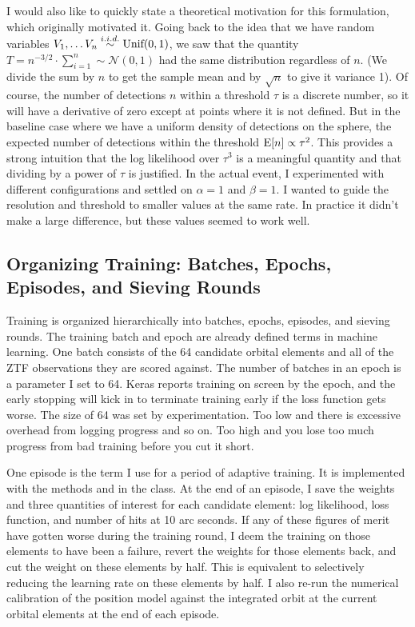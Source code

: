 I would also like to quickly state a theoretical motivation for this formulation, which originally motivated it.
Going back to the idea that we have random variables $V_1, \ldots V_n \overset{i.i.d.}{\sim} \textnormal{Unif}(0, 1)$,
we saw that the quantity $T = n^{-3/2} \cdot \sum_{i=1}^{n} \sim \mathcal{N}(0,1)$ had the same distribution regardless of $n$.
(We divide the sum by $n$ to get the sample mean and by $\sqrt{n}$ to give it variance 1).
Of course, the number of detections $n$ within a threshold $\tau$ is a discrete number, 
so it will have a derivative of zero except at points where it is not defined.
But in the baseline case where we have a uniform density of detections on the sphere,
the expected number of detections within the threshold $\mathrm{E}[n] \propto \tau^2$.
This provides a strong intuition that the log likelihood over $\tau^3$ is a meaningful quantity
and that dividing by a power of $\tau$ is justified.
In the actual event, I experimented with different configurations and settled on $\alpha=1$ and $\beta=1$.
I wanted to guide the resolution and threshold to smaller values at the same rate.
In practice it didn't make a large difference, but these values seemed to work well.

\subsection{Organizing Training: Batches, Epochs, Episodes, and Sieving Rounds}
Training is organized hierarchically into batches, epochs, episodes, and sieving rounds.
The training batch and epoch are already defined terms in machine learning.
One batch consists of the 64 candidate orbital elements and all of the ZTF observations they are scored against.
The number of batches in an epoch is a parameter I set to 64.
Keras reports training on screen by the epoch, 
and the early stopping will kick in to terminate training early if the loss function gets worse.
The size of 64 was set by experimentation.
Too low and there is excessive overhead from logging progress and so on.
Too high and you lose too much progress from bad training before you cut it short.

One episode is the term I use for a period of adaptive training.
It is implemented with the methods  and  in the  class.
At the end of an episode, I save the weights and three quantities of interest for each candidate element:
log likelihood, loss function, and number of hits at 10 arc seconds.
If any of these figures of merit have gotten worse during the training round,
I deem the training on those elements to have been a failure, revert the weights for those elements back, and cut the weight on these elements by half.
This is equivalent to selectively reducing the learning rate on these elements by half.
I also re-run the numerical calibration of the position model against the  integrated orbit at the current orbital elements at the end of each episode.

